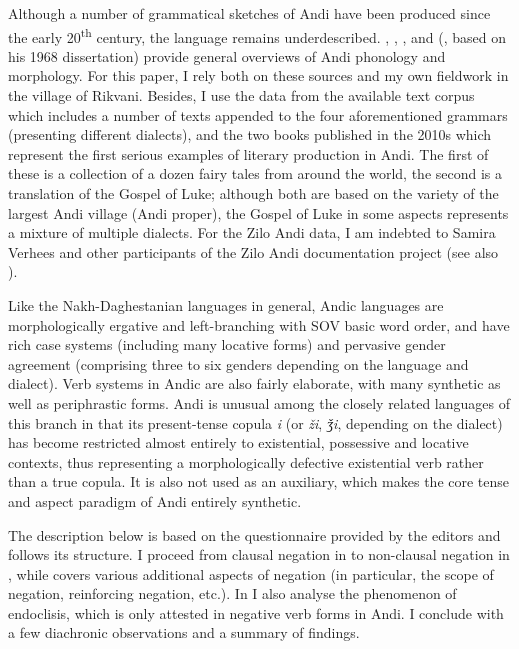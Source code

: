 \documentclass[output=paper,colorlinks=true, citecolor=brown]{langscibook}
\begin{document}
Although a number of grammatical sketches of Andi have been produced since the early 20\textsuperscript{th} century, the language remains underdescribed. \citet{Dirr1906}, \citet{Sulejmanov1957}, \citet{Cercvadze1965}, and \citeauthor{Salimov2010} (\citeyear{Salimov2010}, based on his 1968 dissertation) provide general overviews of Andi phonology and morphology. For this paper, I rely both on these sources and my own fieldwork in the village of Rikvani. Besides, I use the data from the available text corpus which includes a number of texts appended to the four aforementioned grammars (presenting different dialects), and the two books published in the 2010s which represent the first serious examples of literary production in Andi. The first of these is a collection of a dozen fairy tales from around the world, the second is a translation of the Gospel of Luke; although both are based on the variety of the largest Andi village (Andi proper), the Gospel of Luke in some aspects represents a mixture of multiple dialects. For the Zilo Andi data, I am indebted to Samira Verhees and other participants of the Zilo Andi documentation project (see also \citet{KayeEtAlFC}).

Like the Nakh-Daghestanian languages in general, Andic languages are morphologically ergative and left-branching with SOV basic word order, and have rich case systems (including many locative forms) and pervasive gender agreement (comprising three to six genders depending on the language and dialect). Verb systems in Andic are also fairly elaborate, with many synthetic as well as periphrastic forms. Andi is unusual among the closely related languages of this branch in that its present{}-tense copula \textit{i} (or \textit{ži}, \textit{ǯi}, depending on the dialect) has become restricted almost entirely to existential, possessive and locative contexts, thus representing a morphologically defective existential verb rather than a true copula. It is also not used as an auxiliary, which makes the core tense and aspect paradigm of Andi entirely\textsf{} synthetic.

The description below is based on the questionnaire provided by the editors  and follows its structure. I proceed from clausal negation in  to non-clausal negation in , while  covers various additional aspects of negation (in particular, the scope of negation, reinforcing negation, etc.). In  I also analyse the phenomenon of endoclisis, which is only attested in negative verb forms in Andi. I conclude with a few diachronic observations and a summary of findings.
\end{document}
